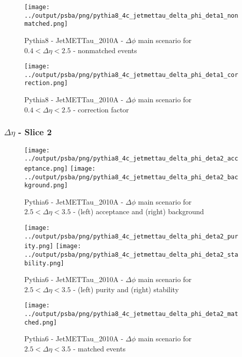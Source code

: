 \documentclass[11pt]{book}
\begin{document}
\begin{figure}[ht]
\centering
\texttt{[image: ../output/psba/png/pythia8\_4c\_jetmettau\_delta\_phi\_deta1\_nonmatched.png]}
\caption{Pythia8 - JetMETTau\_2010A - $\Delta\phi$ main scenario for $0.4 < \Delta\eta < 2.5$ - nonmatched events}
\label{fig:p8_jetmettau_delta_phi_deta1_nonmatched}
\end{figure}

\begin{figure}[ht]
\centering
\texttt{[image: ../output/psba/png/pythia8\_4c\_jetmettau\_delta\_phi\_deta1\_correction.png]}
\caption{Pythia8 - JetMETTau\_2010A - $\Delta\phi$ main scenario for $0.4 < \Delta\eta < 2.5$ - correction factor}
\label{fig:p8_jetmettau_delta_phi_deta1_correction}
\end{figure}

\clearpage
\subsubsection{$\Delta\eta$ - Slice 2}

\begin{figure}[ht]
\centering
\texttt{[image: ../output/psba/png/pythia8\_4c\_jetmettau\_delta\_phi\_deta2\_acceptance.png]}
\texttt{[image: ../output/psba/png/pythia8\_4c\_jetmettau\_delta\_phi\_deta2\_background.png]}
\caption{Pythia6 - JetMETTau\_2010A - $\Delta\phi$ main scenario for $2.5 < \Delta\eta < 3.5$ - (left) acceptance and (right) background}
\label{fig:p6_jetmettau_delta_phi_deta2_ab}
\end{figure}

\begin{figure}[ht]
\centering
\texttt{[image: ../output/psba/png/pythia8\_4c\_jetmettau\_delta\_phi\_deta2\_purity.png]}
\texttt{[image: ../output/psba/png/pythia8\_4c\_jetmettau\_delta\_phi\_deta2\_stability.png]}
\caption{Pythia6 - JetMETTau\_2010A - $\Delta\phi$ main scenario for $2.5 < \Delta\eta < 3.5$ - (left) purity and (right) stability}
\label{fig:p6_jetmettau_delta_phi_deta2_ps}
\end{figure}

\begin{figure}[ht]
\centering
\texttt{[image: ../output/psba/png/pythia8\_4c\_jetmettau\_delta\_phi\_deta2\_matched.png]}
\caption{Pythia6 - JetMETTau\_2010A - $\Delta\phi$ main scenario for $2.5 < \Delta\eta < 3.5$ - matched events}
\label{fig:p6_jetmettau_delta_phi_deta2_matched}
\end{figure}
\end{document}

